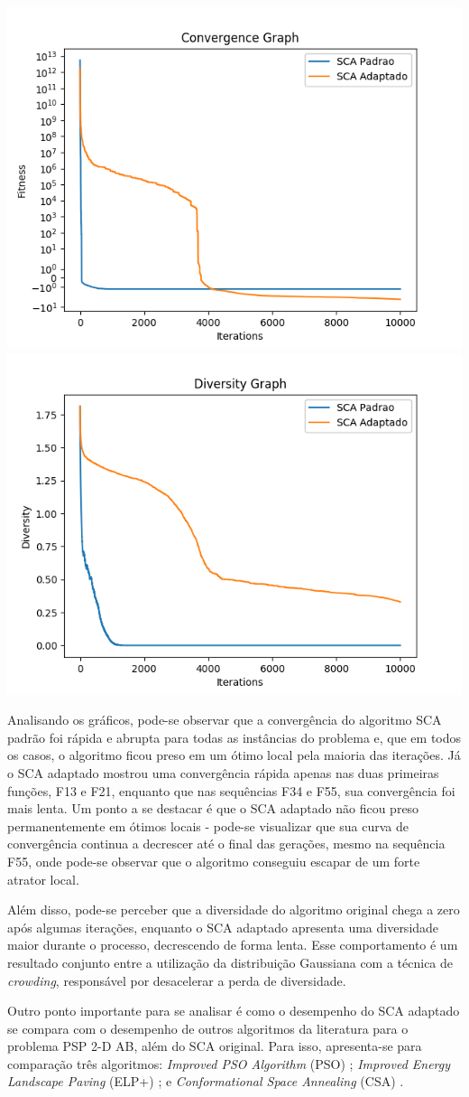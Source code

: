 {
    \centering
    \includegraphics[width=0.49\linewidth]{figuras/convF55_F.png}
    \includegraphics[width=0.49\linewidth]{figuras/divF55_F.png}
    \label{fig:grafF55ExpFinal}
}

Analisando os gráficos, pode-se observar que a convergência do algoritmo SCA padrão foi rápida e abrupta para todas as instâncias do problema e, que em todos os casos, o algoritmo ficou preso em um ótimo local pela maioria das iterações. Já o SCA adaptado mostrou uma convergência rápida apenas nas duas primeiras funções, F13 e F21, enquanto que nas sequências F34 e F55, sua convergência foi mais lenta. Um ponto a se destacar é que o SCA adaptado não ficou preso permanentemente em ótimos locais - pode-se visualizar que sua curva de convergência continua a decrescer até o final das gerações, mesmo na sequência F55, onde pode-se observar que o algoritmo conseguiu escapar de um forte atrator local.

Além disso, pode-se perceber que a diversidade do algoritmo original chega a zero após algumas iterações, enquanto o SCA adaptado apresenta uma diversidade maior durante o processo, decrescendo de forma lenta. Esse comportamento é um resultado conjunto entre a utilização da distribuição Gaussiana com a técnica de \textit{crowding}, responsável por desacelerar a perda de diversidade.

Outro ponto importante para se analisar é como o desempenho do SCA adaptado se compara com o desempenho de outros algoritmos da literatura para o problema PSP 2-D AB, além do SCA original. Para isso, apresenta-se para comparação três algoritmos: \textit{Improved PSO Algorithm} (PSO) \cite{xiaolong}; \textit{Improved Energy Landscape Paving} (ELP+) \cite{liu}; e \textit{Conformational Space Annealing} (CSA) \cite{kim}.


